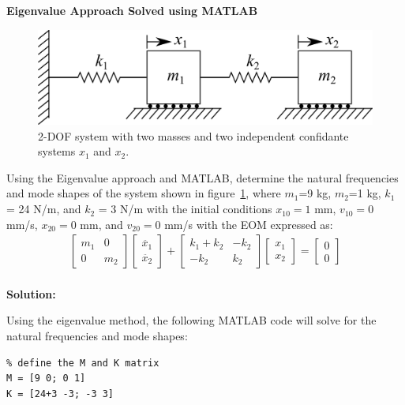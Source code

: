 \documentclass[12pt,letter]{article}
\begin{document}
	
	
		\begin{example}
		\textbf{Eigenvalue Approach Solved using MATLAB}
		
		\begin{figure}[H]
			\centering
			\includegraphics[]{../figures/2-DOF-spring_mass_horizontal.png}
			\caption{2-DOF system with two masses and two independent confidante systems $x_1$ and $x_2$.}
			\label{fig:2-DOF-spring_mass_horizontal_2}
		\end{figure}
		
		Using the Eigenvalue approach and MATLAB, determine the natural frequencies and mode shapes of the system shown in figure~\ref{fig:2-DOF-spring_mass_horizontal_2}, where $m_1$=9 kg, $m_2$=1 kg, $k_1$ = 24 N/m, and $k_2$ = 3 N/m with the initial conditions $x_{10}=1$ mm, $v_{10}=0$ mm/s, $x_{20}=0$ mm, and $v_{20}=0$ mm/s with the EOM expressed as: 
		\begin{eqnarray}
		  \begin{bmatrix} m_1 & 0  \\  0 & m_2 \end{bmatrix}\begin{bmatrix} \ddot{x_1} \\  \ddot{x_2} \end{bmatrix} + \begin{bmatrix} k_1+k_2 & -k_2  \\  -k_2 & k_2 \end{bmatrix}\begin{bmatrix} x_1 \\  x_2 \end{bmatrix} = \begin{bmatrix} 0 \\  0 \end{bmatrix}
		\end{eqnarray} \\
	
		\noindent \textbf{Solution:} 
	
		Using the eigenvalue method, the following MATLAB code will solve for the natural frequencies and mode shapes:
		
		\begin{lstlisting}
% define the M and K matrix
M = [9 0; 0 1]
K = [24+3 -3; -3 3]


\end{lstlisting}
\end{example}
\end{document}
